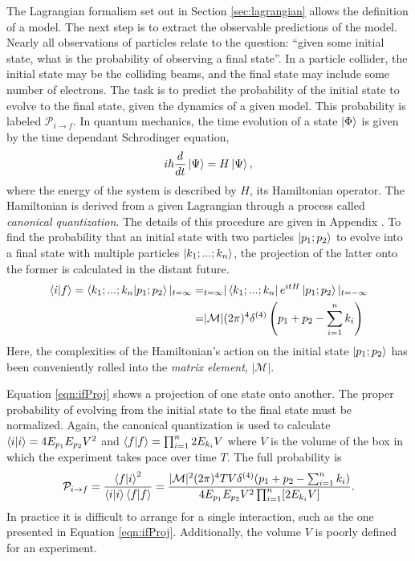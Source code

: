 The Lagrangian formalism set out in Section \ref{sec:lagrangian} allows the definition of a model.
The next step is to extract the observable predictions of the model.
Nearly all observations of particles relate to the question: ``given some initial state, what is the probability of observing a final state''.
In a particle collider, the initial state may be the colliding beams, and the final state may include some number of electrons.
The task is to predict the probability of the initial state to evolve to the final state, given the dynamics of a given model.
This probability is labeled $\mathcal{P}_{i\to f}$.
In quantum mechanics, the time evolution of a state $\ket{\Phi}$ is given by the time dependant Schrodinger equation,
\begin{equation}\begin{split}\label{eqn:schrodinger}
i\hbar\frac{d}{dt}\ket{\Psi}=H\ket{\Psi},
\end{split}\end{equation} 
where the energy of the system is described by $H$, its Hamiltonian operator.
The Hamiltonian is derived from a given Lagrangian through a process called \emph{canonical quantization}. The details of this procedure are given in Appendix \label{sec:canQuant}.
To find the probability that an initial state with two particles $\ket{p_1;p_2}$ to evolve into a final state with multiple particles $\ket{k_1;...;k_n}$, the projection of the latter onto the former is calculated in the distant future.
\begin{equation}\begin{split}\label{eqn:ifProj}
\braket{i|f}=\braket{k_1;...;k_n|p_1;p_2}|_{t=\infty}=&_{t=\infty}|\bra{k_1;...;k_n}e^{itH}\ket{p_1;p_2}|_{t=-\infty} \\
=&|\mathcal{M}|(2\pi)^4\delta^{(4)}\left(p_1+p_2-\sum^n_{i=1} k_i\right) \\
\end{split}\end{equation} 
Here, the complexities of the Hamiltonian's action on the initial state $\ket{p_1;p_2}$ has been conveniently rolled into the \emph{matrix element}, $|\mathcal{M}|$.

Equation \ref{eqn:ifProj} shows a projection of one state onto another.
The proper probability of evolving from the initial state to the final state must be normalized.
Again, the canonical quantization is used to calculate $\braket{i|i}=4E_{p_1}E_{p_2}V^2$ and $\braket{f|f}=\prod_{i=1}^n2E_{k_i}V$ where $V$ is the volume of the box in which the experiment takes pace over time $T$.
The full probability is
\begin{equation}\begin{split}\label{eqn:ifProb}
    \mathcal{P}_{i\to f}=\frac{\braket{f|i}^2}{\braket{i|i}\braket{f|f}}=\frac{|\mathcal{M}|^2(2\pi)^4TV\delta^{(4)}(p_1+p_2-\sum^n_{i=1} k_i)}{4E_{p_1}E_{p_2}V^2\prod_{i=1}^n[2E_{k_i}V]}.
\end{split}\end{equation} 
In practice it is difficult to arrange for a single interaction, such as the one presented in Equation \ref{eqn:ifProj}.
Additionally, the volume $V$ is poorly defined for an experiment.

